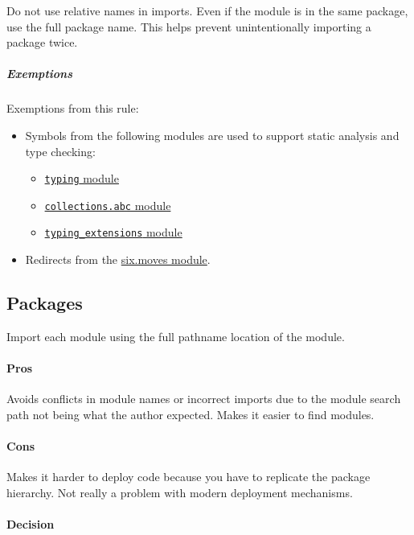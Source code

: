 \documentclass[
]{article}
\providecommand{\tightlist}{%
  \setlength{\itemsep}{0pt}\setlength{\parskip}{0pt}}
\begin{document}
Do not use relative names in imports. Even if the module is in the same
package, use the full package name. This helps prevent unintentionally
importing a package twice.

\subparagraph{Exemptions}

Exemptions from this rule:

\begin{itemize}
\tightlist
\item
  Symbols from the following modules are used to support static analysis
  and type checking:

  \begin{itemize}
  \tightlist
  \item
    \hyperref[typing-imports]{\texttt{typing} module}
  \item
    \hyperref[typing-imports]{\texttt{collections.abc} module}
  \item
    \href{https://github.com/python/typing_extensions/blob/main/README.md}{\texttt{typing\_extensions}
    module}
  \end{itemize}
\item
  Redirects from the
  \href{https://six.readthedocs.io/\#module-six.moves}{six.moves
  module}.
\end{itemize}

\subsection{Packages}

Import each module using the full pathname location of the module.

\paragraph{Pros}

Avoids conflicts in module names or incorrect imports due to the module
search path not being what the author expected. Makes it easier to find
modules.

\paragraph{Cons}

Makes it harder to deploy code because you have to replicate the package
hierarchy. Not really a problem with modern deployment mechanisms.

\paragraph{Decision}
\end{document}
